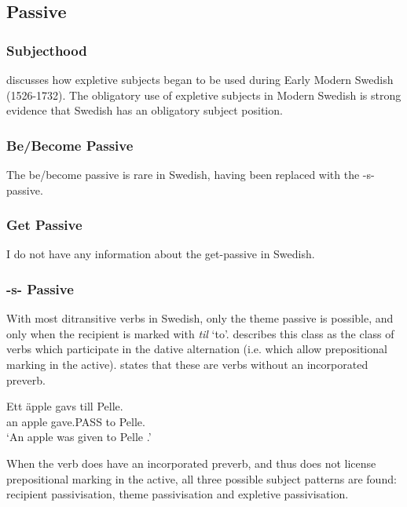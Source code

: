 \subsection{Passive}
\subsubsection{Subjecthood}
\cite{Falk.1997} discusses how expletive subjects began to be used during Early Modern Swedish (1526-1732). The obligatory use of expletive subjects in Modern Swedish is strong evidence that Swedish has an obligatory subject position.
\subsubsection{Be/Become Passive}
The be/become passive is rare in Swedish, having been replaced with the -s- passive.
\subsubsection{Get Passive}
I do not have any information about the get-passive in Swedish.
\subsubsection{-s- Passive}
With most ditransitive verbs in Swedish, only the theme passive is possible, and only when the recipient is marked with \emph{til} `to'. \cite{Anward.1989} describes this class as the class of verbs which participate in the dative alternation (i.e. which allow prepositional marking in the active). \cite{Lundquist.2006} states that these are verbs without an incorporated preverb.
\begin{exe}
\ex 
\begin{xlist}
\ex \gll Ett äpple gavs till Pelle.\\
 an apple gave.PASS to Pelle.\\
\trans `An apple was given to Pelle \citep{Anward.1989,Lundquist.2006}.'
\end{xlist}
\end{exe}
When the verb does have an incorporated preverb, and thus does not license prepositional marking in the active, all three possible subject patterns are found: recipient passivisation, theme passivisation and expletive passivisation.

